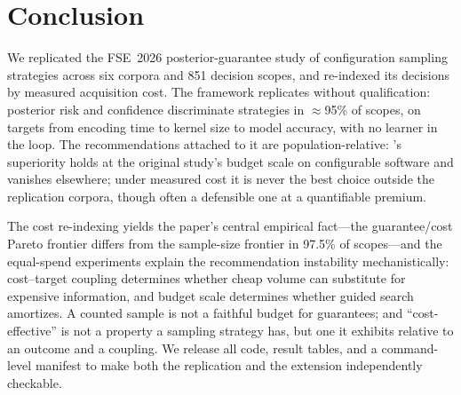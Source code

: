 \section{Conclusion}
\label{sec:conclusion}

We replicated the FSE~2026 posterior-guarantee study of configuration
sampling strategies across six corpora and 851 decision scopes, and
re-indexed its decisions by measured acquisition cost. The framework
replicates without qualification: posterior risk and confidence
discriminate strategies in $\approx$95\% of scopes, on targets from
encoding time to kernel size to model accuracy, with no learner in the
loop. The recommendations attached to it are population-relative: \srs's
superiority holds at the original study's budget scale on configurable
software and vanishes elsewhere; under measured cost it is never the best
choice outside the replication corpora, though often a defensible one at
a quantifiable premium.

The cost re-indexing yields the paper's central empirical fact---the
guarantee/cost Pareto frontier differs from the sample-size frontier in
97.5\% of scopes---and the equal-spend experiments explain the
recommendation instability mechanistically: cost--target coupling
determines whether cheap volume can substitute for expensive information,
and budget scale determines whether guided search amortizes. A counted
sample is not a faithful budget for guarantees; and ``cost-effective'' is
not a property a sampling strategy has, but one it exhibits relative to
an outcome and a coupling. We release all code, result tables, and a
command-level manifest to make both the replication and the extension
independently checkable.
